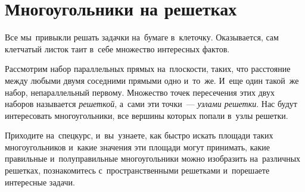 
\section*{Многоугольники на решетках}


Все мы~привыкли решать задачки на~бумаге в~клеточку.
Оказывается, сам клетчатый листок таит в~себе множество интересных фактов.

Рассмотрим набор параллельных прямых на~плоскости, таких, что расстояние между
любыми двумя соседними прямыми одно и~то~же.
И~еще один такой~же набор, непараллельный первому.
Множество точек пересечения этих двух наборов называется \emph{решеткой},
а~сами эти точки~--- \emph{узлами решетки}.
Нас будут интересовать многоугольники, все вершины которых попали в~узлы
решетки.

Приходите на~спецкурс, и~вы~узнаете, как быстро искать площади таких
многоугольников и~какие значения эти площади могут принимать, какие правильные
и~полуправильные многоугольники можно изобразить на~различных решетках,
познакомитесь с~пространственными решетками и~порешаете интересные задачи.

\bigskip

\begin{center}
\end{center}

